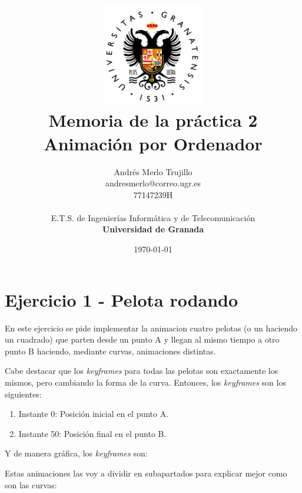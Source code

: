 \documentclass{article}
\title{
\includegraphics[width=1.75in]{imagenes/UGR-Logo.png} \\
\vspace*{1in}
\textbf{Memoria de la práctica 2} \\
Animación por Ordenador \\
\vspace*{0.5in}}
\author{Andrés Merlo Trujillo \\
andresmerlo@correo.ugr.es \\
77147239H \\ 
\vspace*{0.5in} \\
E.T.S. de Ingenierías Informática y de Telecomunicación \\
\textbf{Universidad de Granada}} \date{\today}
\begin{document}
\begin{titlingpage}
\maketitle
\end{titlingpage}

\tableofcontents

\newpage

\pagestyle{fancy}   %

\section{Ejercicio 1 - Pelota rodando}

En este ejercicio se pide implementar la animacion cuatro pelotas (o un haciendo un cuadrado) que parten desde un punto A y llegan al mismo tiempo a otro punto B haciendo, mediante curvas, animaciones distintas.

\bigskip

Cabe destacar que los \textit{keyframes} para todas las pelotas son exactamente los mismos, pero cambiando la forma de la curva. Entonces, los \textit{keyframes} son los siguientes:

\begin{enumerate}
    \item Instante 0: Posición inicial en el punto A.
    \item Instante 50: Posición final en el punto B.
\end{enumerate}

Y de manera gráfica, los \textit{keyframes} son:


\bigskip


Estas animaciones las voy a dividir en subapartados para explicar mejor como son las curvas:
\end{document}
